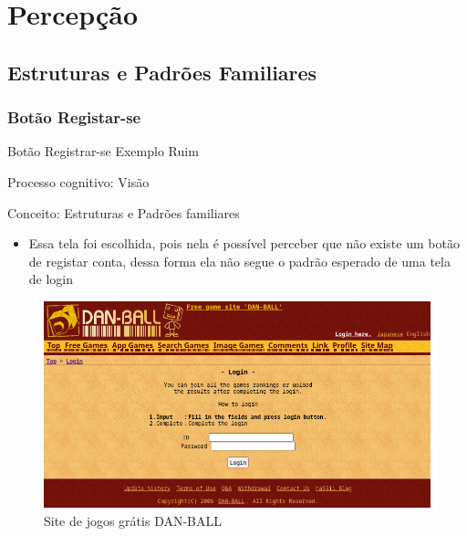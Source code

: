 \documentclass{beamer}
\begin{document}
\section{Percepção}
\subsection{Estruturas e Padrões Familiares}
\subsubsection{Botão Registar-se}

\begin{frame}{Botão Registrar-se Exemplo Ruim}

Processo cognitivo: Visão

Conceito: Estruturas e Padrões familiares

\begin{itemize}
    \item Essa tela foi escolhida, pois nela é possível perceber que não existe um botão de registar conta, dessa forma ela não segue o padrão esperado de uma tela de login
\end{itemize}
\begin{figure}
    \centering
    \includegraphics[scale=0.3]{images/Dan-Ball-Login.png}
    \caption{Site de jogos grátis DAN-BALL}
\end{figure}

\end{frame}
\end{document}
